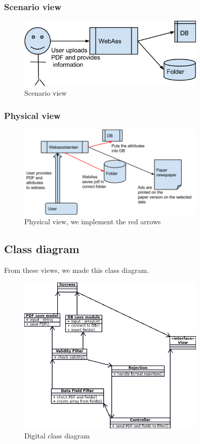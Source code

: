 \subsubsection{Scenario view}
\begin{figure}[h]
\centering
\includegraphics[width=0.8\textwidth]{images/architecture01.png}
\caption{Scenario view}
\label{fig:scenario_view}
\end{figure}


\subsubsection{Physical view}
\begin{figure}[h]
\centering
\includegraphics[width=0.8\textwidth]{images/architecture02.png}
\caption{Physical view, we implement the red arrows}
\label{fig:physical_view}
\end{figure}
\newpage
\subsection{Class diagram}
From these views, we made this class diagram.
\begin{figure}[h]
\centering
\includegraphics[width=0.8\textwidth]{diagrams/class_diagram.png}
\caption{Digital class diagram}
\label{fig:class_diagram}
\end{figure}
